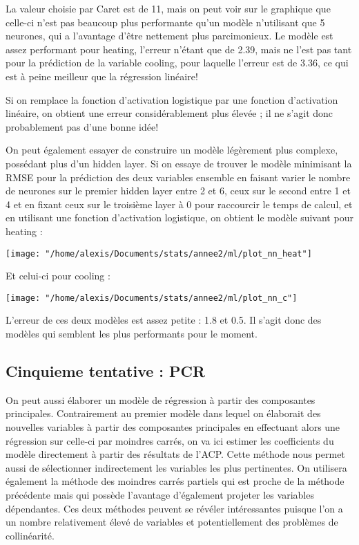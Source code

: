 \documentclass[11pt,a4paper]{article}
\begin{document}
La valeur choisie par Caret est de 11, mais on peut voir sur le graphique que celle-ci n'est pas beaucoup plus performante qu'un modèle n'utilisant que 5 neurones, qui a l'avantage d'être nettement plus parcimonieux. Le modèle est assez performant pour heating, l'erreur n'étant que de 2.39, mais ne l'est pas tant pour la prédiction de la variable cooling, pour laquelle l'erreur est de 3.36, ce qui est à peine meilleur que la régression linéaire!

Si on remplace la fonction d'activation logistique par une fonction d'activation linéaire, on obtient une erreur considérablement plus élevée ; il ne s'agit donc probablement pas d'une bonne idée!

On peut également essayer de construire un modèle légèrement plus complexe, possédant plus d'un hidden layer. Si on essaye de trouver le modèle minimisant la RMSE pour la prédiction des deux variables ensemble en faisant varier le nombre de neurones sur le premier hidden layer entre 2 et 6, ceux sur le second entre 1 et 4 et en fixant ceux sur le troisième layer à 0 pour raccourcir le temps de calcul, et en utilisant une fonction d'activation logistique, on obtient le modèle suivant pour heating :


\begin{center}
\texttt{[image: "/home/alexis/Documents/stats/annee2/ml/plot\_nn\_heat"]}
\end{center}

Et celui-ci pour cooling :

\begin{center}
\texttt{[image: "/home/alexis/Documents/stats/annee2/ml/plot\_nn\_c"]}
\end{center}

L'erreur de ces deux modèles est assez petite : 1.8 et 0.5. Il s'agit donc des modèles qui semblent les plus performants pour le moment.

\subsection{Cinquieme tentative : PCR}

On peut aussi élaborer un modèle de régression à partir des composantes principales. Contrairement au premier modèle dans lequel on élaborait des nouvelles variables à partir des composantes principales en effectuant alors une régression sur celle-ci par moindres carrés, on va ici estimer les coefficients du modèle directement à partir des résultats de l'ACP. Cette méthode nous permet aussi de sélectionner indirectement les variables les plus pertinentes. On utilisera également la méthode des moindres carrés partiels qui est proche de la méthode précédente mais qui possède l'avantage d'également projeter les variables dépendantes. Ces deux méthodes peuvent se révéler intéressantes puisque l'on a un nombre relativement élevé de variables et potentiellement des problèmes de collinéarité.
\end{document}
